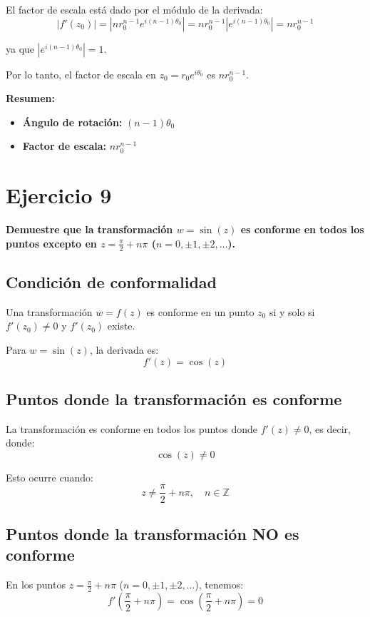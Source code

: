 \documentclass{article}
\begin{document}
El factor de escala está dado por el módulo de la derivada:
$$|f'(z_0)| = |nr_0^{n-1} e^{i(n-1)\theta_0}| = nr_0^{n-1}|e^{i(n-1)\theta_0}| = nr_0^{n-1}$$

ya que $|e^{i(n-1)\theta_0}| = 1$.

Por lo tanto, el factor de escala en $z_0 = r_0 e^{i\theta_0}$ es $nr_0^{n-1}$.

\textbf{Resumen:}
\begin{itemize}
\item \textbf{Ángulo de rotación:} $(n - 1)\theta_0$
\item \textbf{Factor de escala:} $nr_0^{n-1}$
\end{itemize}

\section*{Ejercicio 9}

\textbf{Demuestre que la transformación $w = \sin(z)$ es conforme en todos los puntos excepto en $z = \frac{\pi}{2} + n\pi$ ($n = 0, \pm 1, \pm 2, \ldots$).}

\subsection*{Condición de conformalidad}

Una transformación $w = f(z)$ es conforme en un punto $z_0$ si y solo si $f'(z_0) \neq 0$ y $f'(z_0)$ existe.

Para $w = \sin(z)$, la derivada es:
$$f'(z) = \cos(z)$$

\subsection*{Puntos donde la transformación es conforme}

La transformación es conforme en todos los puntos donde $f'(z) \neq 0$, es decir, donde:
$$\cos(z) \neq 0$$

Esto ocurre cuando:
$$z \neq \frac{\pi}{2} + n\pi, \quad n \in \mathbb{Z}$$

\subsection*{Puntos donde la transformación NO es conforme}

En los puntos $z = \frac{\pi}{2} + n\pi$ ($n = 0, \pm 1, \pm 2, \ldots$), tenemos:
$$f'\left(\frac{\pi}{2} + n\pi\right) = \cos\left(\frac{\pi}{2} + n\pi\right) = 0$$
\end{document}
